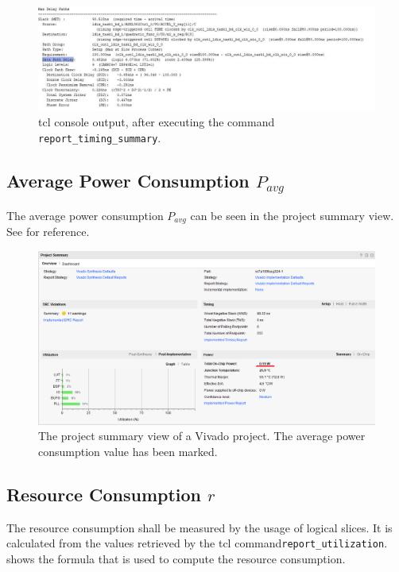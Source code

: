 \documentclass[%
	a4paper,
]
{article}
\begin{document}
\begin{figure}[h!]
	\centering
	\includegraphics[width = \textwidth]{fig/dataPathDelay.jpg}
	\caption{tcl console output, after executing the command \lstinline{report_timing_summary}.}
	\label{fig:timingSummary}
\end{figure}

\subsection*{Average Power Consumption $P_{avg}$}
The average power consumption $P_{avg}$ can be seen in the project summary view. See  for reference.

\begin{figure}[h!]
	\centering
	\includegraphics[width = \textwidth]{fig/Pavg.png}
	\caption{The project summary view of a Vivado project. The average power consumption value has been marked.}
	\label{fig:pavg}
\end{figure}

\subsection*{Resource Consumption $r$}
The resource consumption shall be measured by the usage of logical slices. It is calculated from the values retrieved by the tcl command\lstinline{report_utilization}.  shows the formula that is used to compute the resource consumption. 
\end{document}
